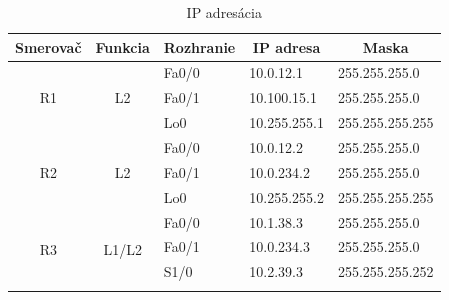 \documentclass[12pt,twoside,a4paper]{report}
\begin{document}
\begin{table}[!htb]
\centering
\caption{IP adresácia}
\label{tab:ip_adresacia}
\begin{tabular}{|c|c|l|l|l|}
\hline
\multicolumn{1}{|c|}{\textbf{Smerovač}}    & \multicolumn{1}{c|}{\textbf{Funkcia}}                        & \multicolumn{1}{c|}{\textbf{Rozhranie}} & \multicolumn{1}{c|}{\textbf{IP adresa}} & \multicolumn{1}{c|}{\textbf{Maska}} \\ \hline
\multirow{3}{*}{R1}  & \multirow{3}{*}{L2}                   & Fa0/0                                   & 10.0.12.1                               & 255.255.255.0                       \\ \cline{3-5} 
                     &                                         & Fa0/1                                   & 10.100.15.1                             & 255.255.255.0                       \\ \cline{3-5} 
                     &                                         & Lo0                                     & 10.255.255.1                            & 255.255.255.255                     \\ \hline
\multirow{3}{*}{R2}  & \multirow{3}{*}{L2}             & Fa0/0                                   & 10.0.12.2                               & 255.255.255.0                       \\ \cline{3-5} 
                     &                                         & Fa0/1                                   & 10.0.234.2                             & 255.255.255.0                       \\ \cline{3-5}
                     &                                         & Lo0                                     & 10.255.255.2                            & 255.255.255.255                     \\ \hline
\multirow{4}{*}{R3}  & \multirow{4}{*}{L1/L2}                    & Fa0/0                                   & 10.1.38.3                               & 255.255.255.0                       \\ \cline{3-5} 
                     &                                         & Fa0/1                                   & 10.0.234.3                              & 255.255.255.0                       \\ \cline{3-5} 
                     &                                         & S1/0                                    & 10.2.39.3                               & 255.255.255.252                     \\ \cline{3-5} 

\end{tabular}
\end{table}
\end{document}
